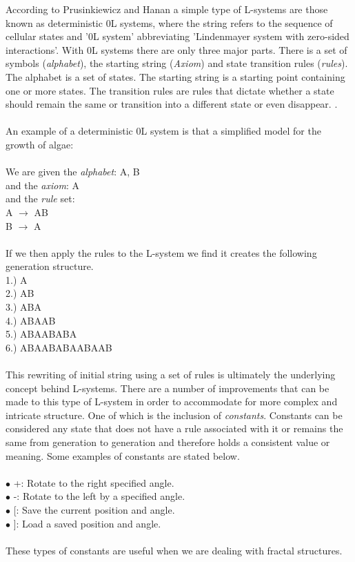 According to Prusinkiewicz and Hanan a simple type of L-systems are those known as deterministic 0L systems, where the string refers to the sequence of cellular states and '0L system' abbreviating 'Lindenmayer system with zero-sided interactions'.  With 0L systems there are only three major parts. There is a set of symbols (\textit{alphabet}), the starting string (\textit{Axiom}) and state transition rules (\textit{rules}). The alphabet is a set of states. The starting string is a starting point containing one or more states. The transition rules are rules that dictate whether a state should remain the same or transition into a different state or even disappear. \cite{prusinkiewicz2013lindenmayer}. \\
\\
An example of a deterministic 0L system is that a simplified model for the growth of algae: \\
\\
We are given the \textit{alphabet}: A, B \\ 
and the \textit{axiom}: A \\
and the \textit{rule} set: \\ 
A $\rightarrow$ AB \\
B $\rightarrow$ A \\
\\
If we then apply the rules to the L-system we find it creates the following generation structure. \\
1.) A \\
2.) AB \\
3.) ABA \\
4.) ABAAB \\
5.) ABAABABA \\
6.) ABAABABAABAAB \\
\\
This rewriting of initial string using a set of rules is ultimately the underlying concept behind L-systems. There are a number of improvements that can be made to this type of L-system in order to accommodate for more complex and intricate structure. One of which is the inclusion of \textit{constants}. Constants can be considered any state that does not have a rule associated with it or remains the same from generation to generation and therefore holds a consistent value or meaning. Some examples of constants are stated below. \\
\\
$\bullet$ +: Rotate to the right specified angle. \\
$\bullet$ -: Rotate to the left by a specified angle.  \\
$\bullet$ [: Save the current position and angle. \\
$\bullet$ ]: Load a saved position and angle. \\
\\
These types of constants are useful when we are dealing with fractal structures.

